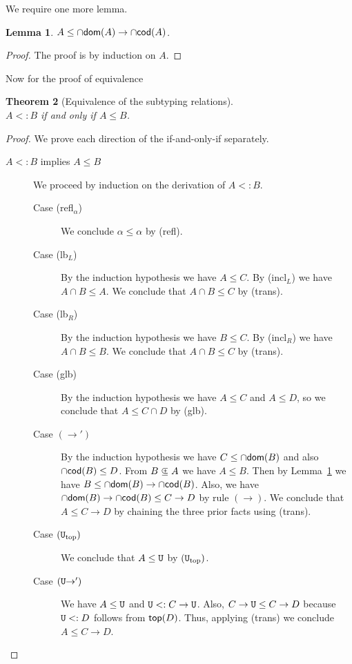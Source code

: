 \documentclass{article}
\newtheorem{theorem}{Theorem}
\newtheorem{lemma}[theorem]{Lemma}
\begin{document}
\noindent We require one more lemma.

\begin{lemma}
  \label{lem:dv↦cv<:v}
  $A \leq \cap\mathsf{dom}(A) \to \cap\mathsf{cod}(A)$.
\end{lemma}
\begin{proof}
  The proof is by induction on $A$.
\end{proof}

\noindent Now for the proof of equivalence

\begin{theorem}[Equivalence of the subtyping relations]\ \\
  $A <: B$ if and only if $A \leq B$.
\end{theorem}
\begin{proof}
  We prove each direction of the if-and-only-if separately.
  \begin{description}
  \item[$A <: B$ implies $A \leq B$]
    We proceed by induction on the derivation of $A <: B$.
    \begin{description}
    \item[Case (refl$_\alpha$)] We conclude $\alpha \leq \alpha$ by (refl).      
    \item[Case (lb$_L$)] By the induction hypothesis we have $A \leq C$.
      By (incl$_L$) we have $A \cap B \leq A$. We conclude
      that $A \cap B \leq C$ by (trans).
    \item[Case (lb$_R$)] By the induction hypothesis we have $B \leq C$.
      By (incl$_R$) we have $A \cap B \leq B$. We conclude
      that $A \cap B \leq C$ by (trans).
    \item[Case (glb)] By the induction hypothesis we have
      $A \leq C$ and $A \leq D$, so we conclude that
      $A \leq C \cap D$ by (glb).
    \item[Case $(\to')$] By the induction hypothesis we have
      $C \leq \cap\mathsf{dom}(B)$ and also $\cap\mathsf{cod}(B) \leq D$.
      From $B \subsetpluseq A$ we have $A \leq B$.      
      Then by Lemma~\ref{lem:dv↦cv<:v} we have
      $B \leq \cap\mathsf{dom}(B) \to \cap\mathsf{cod}(B)$.
      Also, we have $\cap\mathsf{dom}(B) \to \cap\mathsf{cod}(B) \leq C \to D$ by rule $(\to)$.
      We conclude that $A \leq C \to D$ by chaining the three prior
      facts using (trans).
    \item[Case $(\mathtt{U}_{\mathrm{top}})$]
      We conclude that $A \leq \mathtt{U}$ by $(\mathtt{U}_{\mathrm{top}})$.
    \item[Case $(\mathtt{U}{\to}')$] We have $A \leq \mathtt{U}$ and $\mathtt{U} <: C \to
      \mathtt{U}$.  Also, $C \to \mathtt{U} \leq C \to D$ because $\mathtt{U} <: D$ follows
      from $\mathsf{top}(D)$.  Thus, applying (trans) we conclude $A \leq C \to
      D$.
    \end{description}
    

\end{description}
\end{proof}
\end{document}
